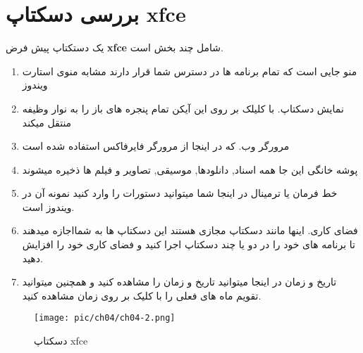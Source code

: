\section{بررسی دسکتاپ xfce}\label{se-32}
یک دستکتاپ پیش فرض 
\textbf{xfce}
شامل چند بخش است.
\begin{enumerate}
	\item منو جایی است که تمام برنامه ها در دسترس شما قرار دارند مشابه منوی استارت ویندوز
	\item نمایش دسکتاپ. با کلیلک بر روی این آیکن تمام پنجره های باز را به نوار وظیفه منتقل میکند
	\item مرورگر وب. که در اینجا از مرورگر فایرفاکس استفاده شده است
	\item پوشه خانگی این جا همه اسناد, دانلودها, موسیقی, تصاویر و فیلم ها ذخیره میشوند
	\item خط فرمان یا ترمینال در اینجا شما میتوانید دستورات را وارد کنید نمونه آن در ویندوز
	است.
	\item فضای کاری. 
	اینها مانند دسکتاپ مجازی هستند این دسکتاپ ها به  شمااجازه میدهند تا برنامه های خود را در دو یا چند دسکتاپ اجرا کنید و فضای کاری خود را افزایش دهید.
	\item تاریخ و زمان
	در اینجا میتوانید تاریخ و زمان را مشاهده کنید و همچنین میتوانید تقویم ماه های فعلی را با کلیک بر روی زمان مشاهده کنید.
\end{enumerate}
\begin{figure}[H]%
	\caption{دسکتاپ xfce}
	\begin{center}
		\texttt{[image: pic/ch04/ch04-2.png]}
	\end{center}
	\label{pic-18}
\end{figure} 
